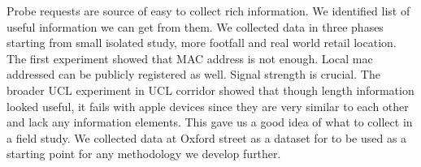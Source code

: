 Probe requests are source of easy to collect rich information.
We identified list of useful information we can get from them.
We collected data in three phases starting from small isolated study, more footfall and real world retail location.
The first experiment showed that MAC address is not enough. Local mac addressed can be publicly registered as well.
Signal strength is crucial.
The broader UCL experiment in UCL corridor showed that though length information looked useful, it fails with apple devices since they are very similar to each other and lack any information elements. 
This gave us a good idea of what to collect in a field study. 
We collected data at Oxford street as a dataset for to be used as a starting point for any methodology we develop further.

